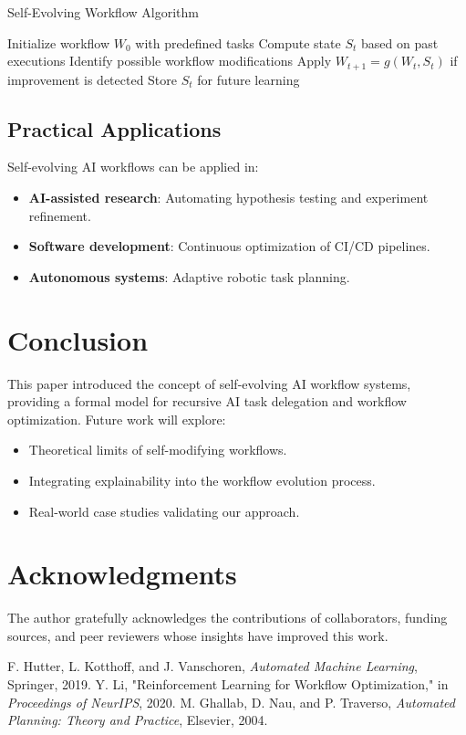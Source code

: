 \documentclass{article}
\begin{document}
\begin{algorithm}
\caption{Self-Evolving Workflow Algorithm}
\begin{algorithmic}
    \STATE Initialize workflow $W_0$ with predefined tasks
        \STATE Compute state $S_t$ based on past executions
        \STATE Identify possible workflow modifications
        \STATE Apply $W_{t+1} = g(W_t, S_t)$ if improvement is detected
        \STATE Store $S_t$ for future learning
    \ENDFOR
\end{algorithmic}
\end{algorithm}

\subsection{Practical Applications}

Self-evolving AI workflows can be applied in:
\begin{itemize}
    \item \textbf{AI-assisted research}: Automating hypothesis testing and experiment refinement.
    \item \textbf{Software development}: Continuous optimization of CI/CD pipelines.
    \item \textbf{Autonomous systems}: Adaptive robotic task planning.
\end{itemize}

\section{Conclusion}

This paper introduced the concept of self-evolving AI workflow systems, providing a formal model for recursive AI task delegation and workflow optimization. Future work will explore:
\begin{itemize}
    \item Theoretical limits of self-modifying workflows.
    \item Integrating explainability into the workflow evolution process.
    \item Real-world case studies validating our approach.
\end{itemize}

\section*{Acknowledgments}
The author gratefully acknowledges the contributions of collaborators, funding sources, and peer reviewers whose insights have improved this work.

\begin{thebibliography}{9}
 F. Hutter, L. Kotthoff, and J. Vanschoren, \textit{Automated Machine Learning}, Springer, 2019.
 Y. Li, "Reinforcement Learning for Workflow Optimization," in \textit{Proceedings of NeurIPS}, 2020.
 M. Ghallab, D. Nau, and P. Traverso, \textit{Automated Planning: Theory and Practice}, Elsevier, 2004.
\end{thebibliography}
\end{document}
